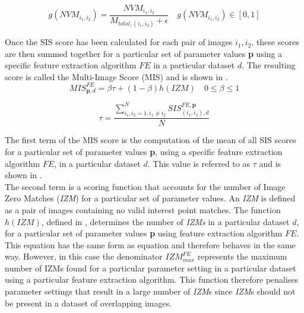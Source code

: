 \begin{equation}
g(NVM_{i_1, i_2}) = \frac{NVM_{i_1, i_2}}{M_{total, (i_1, i_2)} + \epsilon} \quad g(NVM_{i_1, i_2}) \in [0, 1] %
\label{eqn:nvm}
\end{equation}

Once the SIS score has been calculated for each pair of images $i_1, i_2$, these scores are then summed together for a particular set of parameter values \textbf{p} using a specific feature extraction algorithm $FE$ in a particular dataset $d$. The resulting score is called the Multi-Image Score (MIS) and is shown in .\\



\begin{equation}
MIS_{\textbf{p}, d}^{FE} = \beta \tau + (1-\beta) h(\textit{IZM}) \quad 0 \leq \beta \leq 1
\label{eqn:mims}
\end{equation}

\begin{equation}
\tau = \frac{\sum_{i_1, i_2=1 , i_1 \neq i_2}^{N} \textit{SIS}_{(i_1, i_2),d}^{FE,\textbf{p}}}{N}
\label{eqn:tau}
\end{equation}

The first term of the MIS score is the computation of the mean of all SIS scores for a particular set of parameter values \textbf{p}, using a specific feature extraction algorithm $FE$, in a particular dataset $d$. This value is referred to as $\tau$ and is shown in .\\

The second term is a scoring function that accounts for the number of Image Zero Matches (\textit{IZM}) for a particular set of parameter values. An \textit{IZM} is defined as a pair of images containing no valid interest point matches. The function $h(IZM)$, defined in , determines the number of \textit{IZMs} in a particular dataset $d$, for a particular set of parameter values \textbf{p} using feature extraction algorithm $FE$. This equation has the same form as equation  and therefore behaves in the same way. However, in this case the denominator $\textit{IZM}_{max}^{FE}$ represents the maximum number of IZMs found for a particular parameter setting in a particular dataset using a particular feature extraction algorithm. This function therefore penalises parameter settings that result in a large number of \textit{IZM}s since \textit{IZM}s should not be present in a dataset of overlapping images. \\

